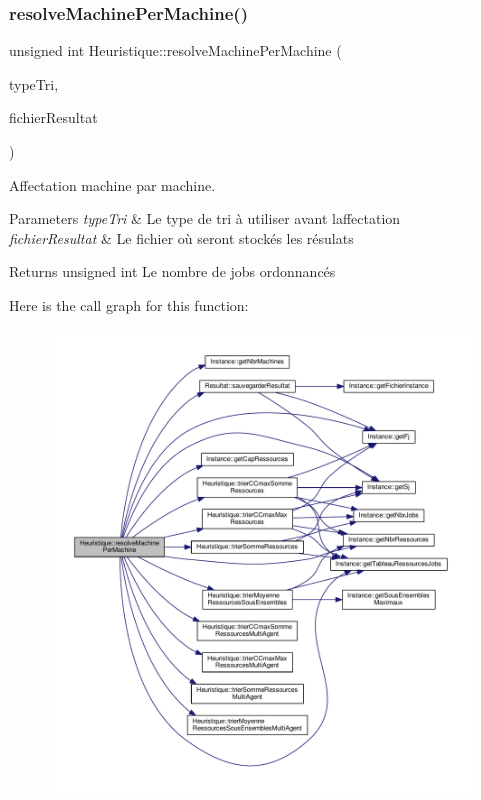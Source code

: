 \subsubsection{\texorpdfstring{resolve\+Machine\+Per\+Machine()}{resolveMachinePerMachine()}}
{\footnotesize\ttfamily unsigned int Heuristique\+::resolve\+Machine\+Per\+Machine (\begin{DoxyParamCaption}\item[{Q\+String}]{type\+Tri,  }\item[{Q\+String}]{fichier\+Resultat }\end{DoxyParamCaption})}



Affectation machine par machine. 


\begin{DoxyParams}{Parameters}
{\em type\+Tri} & Le type de tri à utiliser avant l\textquotesingle{}affectation \\
\hline
{\em fichier\+Resultat} & Le fichier où seront stockés les résulats \\
\hline
\end{DoxyParams}
\begin{DoxyReturn}{Returns}
unsigned int Le nombre de jobs ordonnancés 
\end{DoxyReturn}
Here is the call graph for this function\+:
\nopagebreak
\begin{figure}[H]
\begin{center}
\leavevmode
\includegraphics[width=350pt]{classHeuristique_ad8a57ed34b0c46f6d65e501ee99da498_cgraph}
\end{center}
\end{figure}
\mbox{\label{classHeuristique_a06be9aa588fa801a9a4fb19f8ea79179}} 
